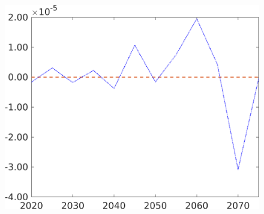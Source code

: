 \begin{figure}[h!!]
\begin{minipage}[]{0.32\textwidth}
	\end{minipage}
\begin{minipage}[]{0.32\textwidth}
	\includegraphics[width=1\textwidth]{../../codding_model/own_basedOnFried/optimalPol_190722_tidiedUp/figures/all_July22/taul_DDCompEffOPT_T_NoTaus_pol4_spillover0_noskill0_sep1_xgrowth1_etaa0.79_lgd0_lff0.png}
\end{minipage}
\end{figure}


